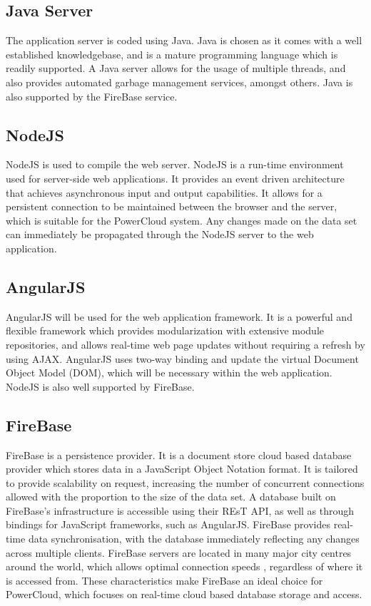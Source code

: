 \documentclass{article}
\begin{document}
	\subsection{Java Server}
	
	The application server is coded using Java. Java is chosen as it comes with a well established knowledgebase, and is a mature programming language which is readily supported. A Java server allows for the usage of multiple threads, and also provides automated garbage management services, amongst others. Java is also supported by the FireBase service.
	
	\subsection{NodeJS}
	
	NodeJS is used to compile the web server. NodeJS is a run-time environment used for server-side web applications. It provides an event driven architecture that achieves asynchronous input and output capabilities. It allows for a  persistent connection to be maintained between the browser and the server, which is suitable for the PowerCloud system. Any changes made on the data set can immediately be propagated through the NodeJS server to the web application.
	
	\subsection{AngularJS}
	
	AngularJS will be used for the web application framework. It is a powerful and flexible framework which provides modularization with extensive module repositories, and allows real-time web page updates without requiring a refresh by using AJAX. AngularJS uses two-way binding and update the virtual Document Object Model (DOM), which will be necessary within the web application. NodeJS is also well supported by FireBase.
	
	\subsection{FireBase}
	
	FireBase is a persistence provider. It is a document store cloud based database provider which stores data in a JavaScript Object Notation format. It is tailored to provide scalability on request, increasing the number of concurrent connections allowed with the proportion to the size of the data set. A database built on FireBase's infrastructure is accessible using their REsT API, as well as through bindings for JavaScript frameworks, such as AngularJS. FireBase provides real-time data synchronisation, with the database immediately reflecting any changes across multiple clients. FireBase servers are located in many major city centres around the world, which allows optimal connection speeds , regardless of where it is accessed from. These characteristics make FireBase an ideal choice for PowerCloud, which focuses on real-time cloud based database storage and access.
	
\end{document}
